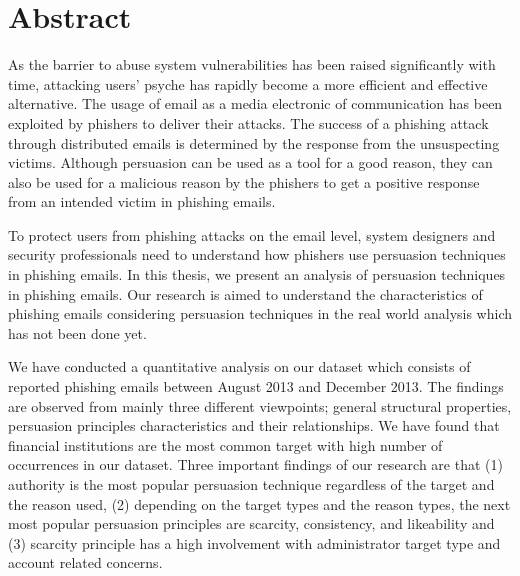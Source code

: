 \begingroup
\let\clearpage\relax
\let\cleardoublepage\relax



\chapter*{Abstract}

As the barrier to abuse system vulnerabilities has been raised significantly
with time, attacking users' psyche has rapidly become a more efficient
and effective alternative. The usage of email as a media electronic
of communication has been exploited by phishers to deliver their attacks.
The success of a phishing attack through distributed emails is determined
by the response from the unsuspecting victims. Although persuasion
can be used as a tool for a good reason, they can also be used for
a malicious reason by the phishers to get a positive response from
an intended victim in phishing emails.

To protect users from phishing attacks on the email level, system
designers and security professionals need to understand how phishers
use persuasion techniques in phishing emails. In this thesis, we present
an analysis of persuasion techniques in phishing emails. Our research
is aimed to understand the characteristics of phishing emails considering
persuasion techniques in the real world analysis which has not been
done yet. 

We have conducted a quantitative analysis on our dataset which consists
of reported phishing emails between August 2013 and December 2013.\foreignlanguage{english}{
The findings are observed from mainly three different viewpoints;
general structural properties, persuasion principles characteristics
and their relationships}. We have found that financial institutions
are the most common target with high number of occurrences in our
dataset. \foreignlanguage{english}{Three important findings of our
research are that (1) authority is the most popular persuasion technique
regardless of the target and the reason used, (2) depending on the
target types and the reason types, the next most popular persuasion
principles are scarcity, consistency, and likeability and (3) scarcity
principle has a high involvement with administrator target type and
account related concerns. }

\vfill{}


\endgroup
